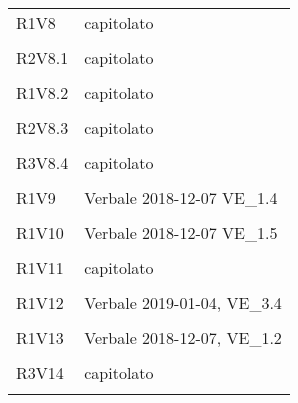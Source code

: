 \begin{longtable}{ >{\centering}p{}
		>{\centering}p{}}
	R1V8 & capitolato\\\tabularnewline
	
	R2V8.1 & capitolato\\\tabularnewline
	
	R1V8.2 & capitolato\\\tabularnewline
	
	R2V8.3 & capitolato\\\tabularnewline
	
	R3V8.4 & capitolato\\\tabularnewline
	
	R1V9 & Verbale 2018-12-07  VE\_1.4\\\tabularnewline
	
	R1V10 & Verbale 2018-12-07  VE\_1.5\\\tabularnewline
	
	R1V11 & capitolato\\\tabularnewline
	
	R1V12 & Verbale 2019-01-04, VE\_3.4\\\tabularnewline
	
	R1V13 & Verbale 2018-12-07, VE\_1.2\\\tabularnewline
	
	R3V14 & capitolato\\\tabularnewline
	
	
\end{longtable}
